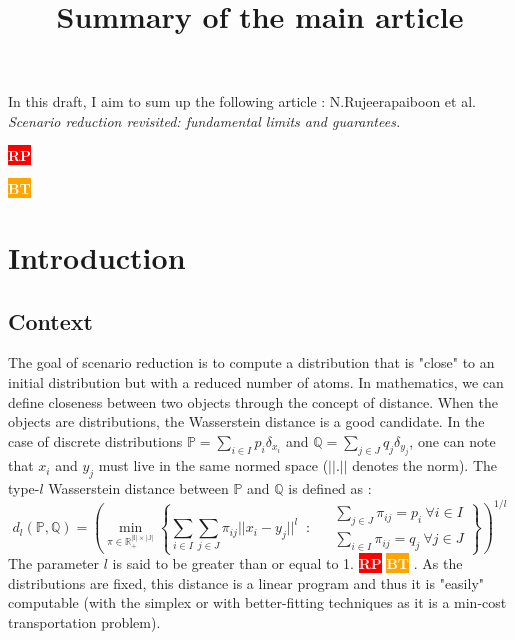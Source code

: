 \documentclass{amsart}
\title{Summary of the main article}
\newcommand{\nb}[3]{
		{\colorbox{#2}{\bfseries\sffamily\tiny\textcolor{white}{#1}}}
		{\textcolor{#2}{\text{$\blacktriangleright$}{\textcolor{#2}{#3}}\text{$\blacktriangleleft$}}}}
\newcommand{\rp}[1]{\nb{RP}{red}{#1}}
\newcommand{\bt}[1]{\nb{BT}{orange}{#1}}
\begin{document}
\maketitle
In this draft, I aim to sum up the following article : N.Rujeerapaiboon et al. \textit{Scenario reduction revisited: fundamental limits and
guarantees.}
\rp{I guess it's not the right way to cite an article... but I don't know the right way.}
\bt{Via the use of bibtex, see for example https://latex-tutorial.com/tutorials/bibtex/. I added biblio.bib file with a few references to the repo.}

\section{Introduction}
\subsection{Context}
The goal of scenario reduction is to compute a distribution that is "close" to an initial distribution but with a reduced number of atoms. In mathematics, we can define closeness between two objects through the concept of distance. When the objects are distributions, the Wasserstein distance is a good candidate. In the case of discrete distributions $\mathbb{P}=\sum_{i\in I}p_i\delta_{x_i}$ and $\mathbb{Q}=\sum_{j\in J}q_j\delta_{y_j}$, one can note that $x_i$ and $y_j$ must live in the same normed space ($||.||$ denotes the norm). The type-$l$ Wasserstein distance between $\mathbb{P}$ and $\mathbb{Q}$ is defined as :  
\[
d_l(\mathbb{P},\mathbb{Q})=\left(\min_{\pi\in\mathbb{R_+^{|I|\times|J|}}}\left\{ 
\sum_{i\in I}\sum_{j\in J}\pi_{ij}||x_i-y_j||^l \: \text{ : } \:  \begin{aligned}
& \sum_{j\in J}\pi_{ij}=p_i \: \forall i\in I \\
& \sum_{i\in I}\pi_{ij}=q_j \: \forall j\in J
\end{aligned}\right\}\right)^{1/l}
\]
The parameter $l$ is said to be greater than or equal to 1. \rp{don't really know why it's not only greater than 0} \bt{To prove that $d^\ell$ is distance, the difficult part is the triangle inequality. It is a distance for $\ell \geq 1$ and the proof of the triangle inequality is here called the "gluing lemma" (Peyré-Cuturi chapter 1 for our "simple" case). This gluing lemma uses Minkowski's inequality in the case $\ell\geq1$ so that's the reason why. 
It is still an interesting question for $0 < \ell \leq 1$. We have $d_\ell^\ell$ (and not $d\ell$ itself) is a distance as $(x,y) \mapsto \lVert x - y \rVert^\ell$ is already a distance when $0 < \ell \leq 1$ thanks to Minkowski's inequality in the case $\ell \leq 1$.
}. As the distributions are fixed, this distance is a linear program and thus it is "easily" computable (with the simplex or with better-fitting techniques as it is a min-cost transportation problem).
\end{document}
